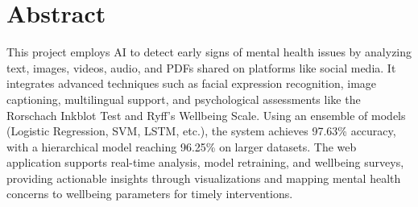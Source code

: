 

\section*{Abstract} 




\noindent
This project employs AI to detect early signs of mental health issues by analyzing text, images, videos, audio, and PDFs shared on platforms like social media. It integrates advanced techniques such as facial expression recognition, image captioning, multilingual support, and psychological assessments like the Rorschach Inkblot Test and Ryff's Wellbeing Scale. Using an ensemble of models (Logistic Regression, SVM, LSTM, etc.), the system achieves 97.63\% accuracy, with a hierarchical model reaching 96.25\% on larger datasets. The web application supports real-time analysis, model retraining, and wellbeing surveys, providing actionable insights through visualizations and mapping mental health concerns to wellbeing parameters for timely interventions.



\newpage
